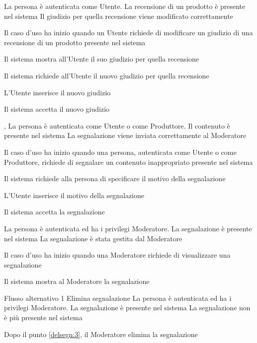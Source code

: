 {}
{La persona è autenticata come Utente. La recensione di un prodotto è presente nel sistema}
{Il giudizio per quella recensione viene modificato correttamente}
{\begin{enumCU}
	\item Il caso d'uso ha inizio quando un Utente richiede di modificare un giudizio di una recensione di un prodotto presente nel sistema
	\item Il sistema mostra all'Utente il suo giudizio per quella recensione
	\item Il sistema richiede all'Utente il nuovo giudizio per quella recensione
	\item L'Utente inserisce il nuovo giudizio
	\item Il sistema accetta il nuovo giudizio
\end{enumCU}}

\tabcuvspace

{, }
{La persona è autenticata come Utente o come Produttore. Il contenuto è presente nel sistema}
{La segnalazione viene inviata correttamente al Moderatore}
{\begin{enumCU}
	\item Il caso d'uso ha inizio quando una persona, autenticata come Utente o come Produttore, richiede di segnalare un contenuto inappropriato presente nel sistema
	\item Il sistema richiede alla persona di specificare il motivo della segnalazione
	\item L'Utente inserisce il motivo della segnalazione
	\item Il sistema accetta la segnalazione
\end{enumCU}}

\tabcuvspace

{}
{La persona è autenticata ed ha i privilegi Moderatore. La segnalazione è presente nel sistema}
{La segnalazione è stata gestita dal Moderatore}
{\begin{enumCU}
	\item Il caso d'uso ha inizio quando una Moderatore richiede di visualizzare una segnalazione
	\item Il sistema mostra al Moderatore la segnalazione \label{delsegn:3}
\end{enumCU}}
%
{Flusso alternativo 1}%
{Elimina segnalazione}%
{La persona è autenticata ed ha i privilegi Moderatore. La segnalazione è presente nel sistema}
{La segnalazione non è più presente nel sistema}%
{\begin{enumCU}
		\item Dopo il punto \ref{delsegn:3}, il Moderatore elimina la segnalazione
\end{enumCU}}%

